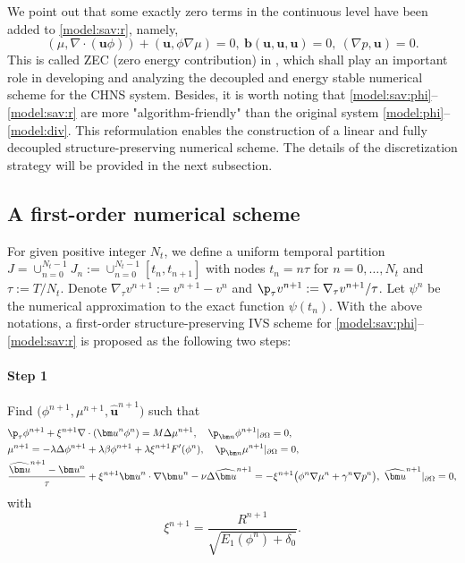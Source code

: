 \begin{remark}
	We  point out that some exactly zero terms in the continuous level have been added to \eqref{model:sav:r}, namely, 
	\begin{equation*} 
		(\mu , \nabla \cdot (\bm u \phi) )+  ( {\bm u},  \phi  \nabla\mu ) =0, ~   \bm b(\bm u, \bm u, \bm u) =0, ~ (\nabla p, \bm u) =0.
	\end{equation*}
	This is called  ZEC  (zero energy contribution) in  \cite{chen2021fully,yang2021novelSISC}, which shall  play an important role in developing and analyzing the decoupled and energy stable numerical scheme for the CHNS system. Besides, it is worth noting that \eqref{model:sav:phi}--\eqref{model:sav:r} are more "algorithm-friendly" than the original system \eqref{model:phi}--\eqref{model:div}. This reformulation enables the construction of a linear and fully decoupled structure-preserving numerical scheme. The details of the discretization strategy will be provided in the next subsection.
\end{remark}


\subsection{A first-order numerical scheme} \label{subsec:scheme}
For given positive integer $N_t$, we define a uniform temporal partition $J=\cup_{n=0}^{N_t-1} J_n:=\cup_{n=0}^{N_t-1}[t_{n},t_{n+1}]$ with nodes $t_n=n \tau$ for $n=0, \ldots, N_t$ and $ \tau:=T / N_t$. Denote $\nabla_\tau  v^{n+1}:= v^{n+1}-v^{n}$ and $\p_\tau  v^{n+1}:= \nabla_\tau  v^{n+1}/\tau$.  Let $\psi^n$ be the numerical approximation to the exact function $\psi(t_n)$. With the above notations, a first-order structure-preserving IVS scheme for \eqref{model:sav:phi}--\eqref{model:sav:r} is proposed as the following two steps:

\paragraph{\bf Step 1}  Find $\big(\phi^{n+1}, \mu^{n+1}, \widehat{\bm u}^{n+1}\big)$ such that 
\begin{align}
	& \p_{\tau} \phi^{n+1} + \xi^{n+1}\nabla \cdot({\bm u}^n \phi^n  )=M \Delta \mu^{n+1}, \quad  
	\p_{\bm n} \phi^{n+1}|_{\partial \Omega}=0, \label{scheme:1th:phi}\\
	& \mu^{n+1}=- \lambda \Delta \phi^{n+1} + \lambda \beta \phi^{n+1} + \lambda  \xi^{n+1} F^{\prime}(\phi^n), \quad   
	\p_{\bm n} \mu^{n+1} |_{\partial \Omega}=0, \label{scheme:1th:mu} \\
	& \frac{\widehat {\bm u}^{n+1} -  \bm u^n}{\tau} + \xi^{n+1} {\bm u}^n\cdot\nabla {\bm u}^n - \nu\Delta   \widehat {\bm u}^{n+1} = -\xi^{n+1}  \big( \phi^n \nabla \mu^n+\gamma^n \nabla p^n \big), ~
	\widehat{\bm u}^{n+1}|_{\partial \Omega}=0, \label{scheme:1th:uhat}   
\end{align}
with
\begin{equation} \label{scheme:1th:xi}
	\xi^{n+1}=\frac{R^{n+1}}{\sqrt{E_1(\phi^n)+\delta_0}}.
\end{equation}

